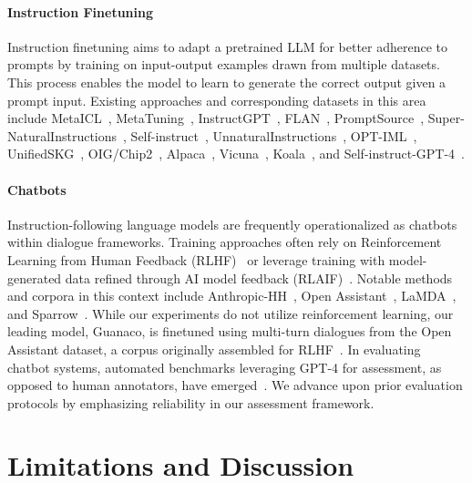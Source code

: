 \paragraph{Instruction Finetuning} Instruction finetuning aims to adapt a pretrained LLM for better adherence to prompts by training on input-output examples drawn from multiple datasets. This process enables the model to learn to generate the correct output given a prompt input. Existing approaches and corresponding datasets in this area include MetaICL~\citep{min2021metaicl}, MetaTuning~\citep{zhong2021adapting}, InstructGPT~\citep{ouyang2022training}, FLAN~\citep{wei2021finetuned,chung2022scaling}, PromptSource~\citep{bach2022promptsource}, Super-NaturalInstructions~\citep{wang2022super,sanh2021multitask}, Self-instruct~\citep{wang2022self}, UnnaturalInstructions~\citep{honovich2022unnatural}, OPT-IML~\citep{iyer2022opt}, UnifiedSKG~\citep{xie2022unifiedskg}, OIG/Chip2~\citep{laion2023}, Alpaca~\citep{alpaca}, Vicuna~\citep{vicuna2023}, Koala~\citep{koala_blogpost_2023}, and Self-instruct-GPT-4~\citep{peng2023instruction}.

\paragraph{Chatbots} Instruction-following language models are frequently operationalized as chatbots within dialogue frameworks. Training approaches often rely on Reinforcement Learning from Human Feedback (RLHF)~\citep{christiano2017deep} or leverage training with model-generated data refined through AI model feedback (RLAIF)~\citep{bai2022constitutional}. Notable methods and corpora in this context include Anthropic-HH~\citep{askell2021general,bai2022training}, Open Assistant~\citep{kopf2023openassistant}, LaMDA~\citep{thoppilan2022lamda}, and Sparrow~\citep{glaese2022improving}. While our experiments do not utilize reinforcement learning, our leading model, Guanaco, is finetuned using multi-turn dialogues from the Open Assistant dataset, a corpus originally assembled for RLHF~\citep{kopf2023openassistant}. In evaluating chatbot systems, automated benchmarks leveraging GPT-4 for assessment, as opposed to human annotators, have emerged~\citep{vicuna2023,peng2023instruction}. We advance upon prior evaluation protocols by emphasizing reliability in our assessment framework.

\section{Limitations and Discussion}

